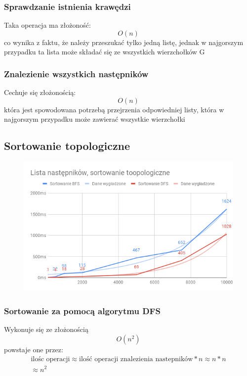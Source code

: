 \documentclass[]{article}
\begin{document}
		\subsubsection{Sprawdzanie istnienia krawędzi}
			Taka operacja ma złożoność:
			\begin{equation}
				O(n)
			\end{equation}
			co wynika z faktu, że należy przeszukać tylko jedną listę, jednak w najgorszym przypadku ta lista może składać się ze wszystkich wierzchołków \gls{G}
		
		\subsubsection{Znalezienie wszystkich następników}
			Cechuje się złożonością:
			\begin{equation}
				O(n)
			\end{equation}
			która jest spowodowana potrzebą przejrzenia odpowiedniej listy, która w najgorszym przypadku może zawierać wszystkie wierzchołki
	\subsection{Sortowanie topologiczne}
		\begin{figure}[H]
			\includegraphics[scale=0.6]{adjacency_list.png}
		\end{figure}
		\subsubsection{Sortowanie za pomocą algorytmu DFS}
			Wykonuje się ze złożonością
			\begin{equation}
				O(n^2)
			\end{equation}
			powstaje one przez:
			\begin{multline}
				\text{ilośc operacji} \approx \text{ilość operacji znalezienia nastepników} * n \approx n * n \\ \approx n^2
			\end{multline}
\end{document}
